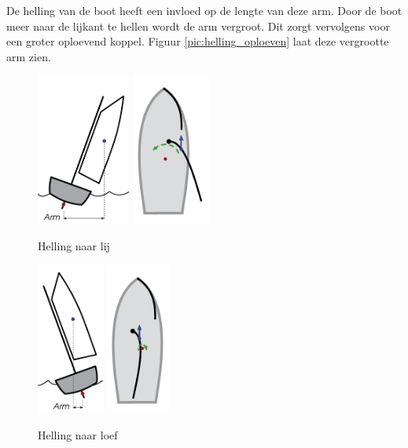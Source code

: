De helling van de boot heeft een invloed op de lengte van deze arm. Door de boot meer naar de lijkant te hellen wordt de arm vergroot. Dit zorgt vervolgens voor een groter oploevend koppel. Figuur \ref{pic:helling_oploeven} laat deze vergrootte arm zien. 

\begin{figure}[H]
	\centering
	\begin{minipage}[b]{0.48\textwidth}
		\centering
		\includegraphics[height=5cm]{Hoofdstukken/Krachten/pdf/helling_lij_achter.pdf}
		\includegraphics[height=5cm]{Hoofdstukken/Krachten/pdf/helling_lij_boven.pdf}
		\caption{Helling naar lij}
		\label{pic:helling_oploeven}
	\end{minipage}
	\hfill
	\begin{minipage}[b]{0.48\textwidth}
		\centering
		\includegraphics[height=5cm]{Hoofdstukken/Krachten/pdf/helling_loef_achter.pdf}
		\includegraphics[height=5cm]{Hoofdstukken/Krachten/pdf/helling_loef_boven.pdf}
		\caption{Helling naar loef}
		\label{pic:helling_afvallen}
	\end{minipage}
\end{figure}

